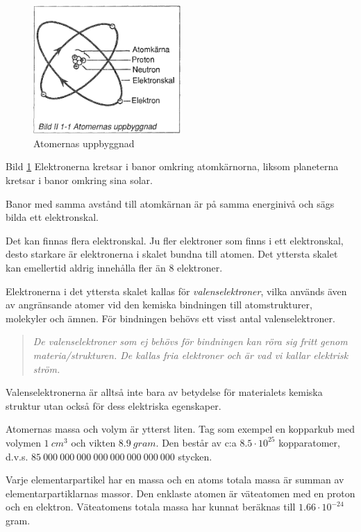 \begin{figure}
  \includegraphics[width=0.5\textwidth]{images/bild_2_1-01}
  \caption{Atomernas uppbyggnad}
  \label{fig:BildII1-1}
  \vspace{-20pt}
\end{figure}

Bild \ref{fig:BildII1-1}
Elektronerna kretsar i banor omkring atomkärnorna, liksom
planeterna kretsar i banor omkring sina solar.

Banor med samma avstånd till atomkärnan är på samma energinivå och sägs bilda
ett elektronskal.

Det kan finnas flera elektronskal. Ju fler elektroner som finns i ett
elektronskal, desto starkare är elektronerna i skalet bundna till atomen. Det
yttersta skalet kan emellertid aldrig innehålla fler än 8 elektroner.

Elektronerna i det yttersta skalet kallas för \emph{valenselektroner}, vilka
används även av angränsande atomer vid den kemiska bindningen till
atomstrukturer, molekyler och ämnen. För bindningen behövs ett visst antal
valenselektroner.

\begin{quote}\emph{
De valenselektroner som ej behövs för bindningen kan röra sig fritt genom
materia/strukturen. De kallas fria elektroner och är vad vi kallar elektrisk ström.
}\end{quote}

Valenselektronerna är alltså inte bara av betydelse för materialets kemiska
struktur utan också för dess elektriska egenskaper.

Atomernas massa och volym är ytterst liten. Tag som exempel en kopparkub med
volymen \(1\ cm^3\) och vikten \(8.9\ gram\). Den består av c:a \(8.5 \cdot 10^{25}\)
kopparatomer, d.v.s. \(85\ 000\ 000\ 000\ 000\ 000\ 000\ 000\ 000\) stycken.

Varje elementarpartikel har en massa och en atoms totala massa är summan av
elementarpartiklarnas massor. Den enklaste atomen är väteatomen med en proton
och en elektron. Väteatomens totala massa har kunnat beräknas till \(1.66 \cdot 10^{-24}\) gram.

